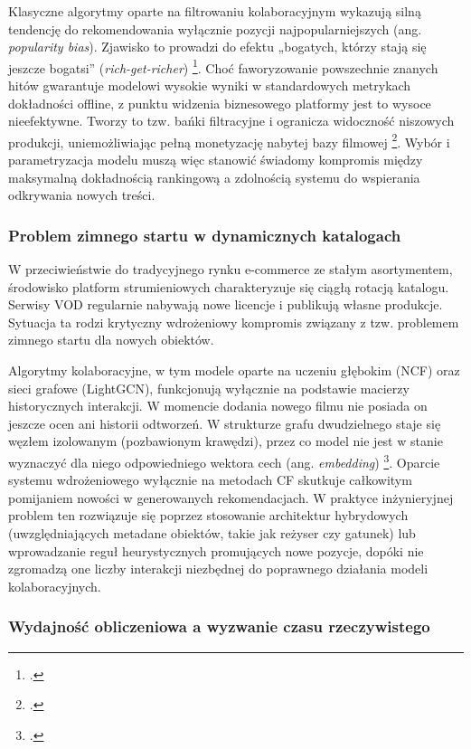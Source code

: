 Klasyczne algorytmy oparte na filtrowaniu kolaboracyjnym wykazują silną tendencję do rekomendowania wyłącznie pozycji najpopularniejszych (ang. \textit{popularity bias}). Zjawisko to prowadzi do efektu „bogatych, którzy stają się jeszcze bogatsi” (\textit{rich-get-richer}) \footcite{celmaMusicRecommendationDiscovery2010}. Choć faworyzowanie powszechnie znanych hitów gwarantuje modelowi wysokie wyniki w standardowych metrykach dokładności offline, z punktu widzenia biznesowego platformy jest to wysoce nieefektywne. Tworzy to tzw. bańki filtracyjne i ogranicza widoczność niszowych produkcji, uniemożliwiając pełną monetyzację nabytej bazy filmowej \footcite{anelliTopNRecommendationAlgorithms2022}. Wybór i parametryzacja modelu muszą więc stanowić świadomy kompromis między maksymalną dokładnością rankingową a zdolnością systemu do wspierania odkrywania nowych treści.

\subsubsection{Problem zimnego startu w dynamicznych katalogach}

W przeciwieństwie do tradycyjnego rynku e-commerce ze stałym asortymentem, środowisko platform strumieniowych charakteryzuje się ciągłą rotacją katalogu. Serwisy VOD regularnie nabywają nowe licencje i publikują własne produkcje. Sytuacja ta rodzi krytyczny wdrożeniowy kompromis związany z tzw. problemem zimnego startu dla nowych obiektów.

Algorytmy kolaboracyjne, w tym modele oparte na uczeniu głębokim (NCF) oraz sieci grafowe (LightGCN), funkcjonują wyłącznie na podstawie macierzy historycznych interakcji. W momencie dodania nowego filmu nie posiada on jeszcze ocen ani historii odtworzeń. W strukturze grafu dwudzielnego staje się węzłem izolowanym (pozbawionym krawędzi), przez co model nie jest w stanie wyznaczyć dla niego odpowiedniego wektora cech (ang. \foreignlanguage{english}{\textit{embedding}}) \footcite{anelliTopNRecommendationAlgorithms2022}. Oparcie systemu wdrożeniowego wyłącznie na metodach CF skutkuje całkowitym pomijaniem nowości w generowanych rekomendacjach. W praktyce inżynieryjnej problem ten rozwiązuje się poprzez stosowanie architektur hybrydowych (uwzględniających metadane obiektów, takie jak reżyser czy gatunek) lub wprowadzanie reguł heurystycznych promujących nowe pozycje, dopóki nie zgromadzą one liczby interakcji niezbędnej do poprawnego działania modeli kolaboracyjnych.

\subsubsection{Wydajność obliczeniowa a wyzwanie czasu rzeczywistego}

